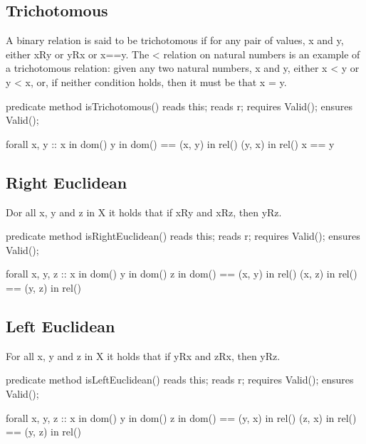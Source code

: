\documentclass[letterpaper,10pt,english]{sphinxmanual}
\begin{document}
\subsection{Trichotomous}
\label{\detokenize{08-relations:trichotomous}}
A binary relation is said to be trichotomous if for any pair of
values, x and y, either xRy or yRx or x==y. The \textless{} relation on natural
numbers is an example of a trichotomous relation: given any two
natural numbers, x and y, either x \textless{} y or y \textless{} x, or, if neither
condition holds, then it must be that x = y.

\begin{sphinxVerbatim}[commandchars=\\\{\}]
predicate method isTrichotomous()
    reads this;
    reads r;
    requires Valid();
    ensures Valid();

\PYGZob{}
    forall x, y :: x in dom() \PYGZam{}\PYGZam{} y in dom() ==\PYGZgt{}
        (x, y) in rel() \textbar{}\textbar{} (y, x) in rel() \textbar{}\textbar{} x == y
\PYGZcb{}
\end{sphinxVerbatim}


\subsection{Right Euclidean}
\label{\detokenize{08-relations:right-euclidean}}
Dor all x, y and z in X it holds that if xRy and xRz, then yRz.

\begin{sphinxVerbatim}[commandchars=\\\{\}]
predicate method isRightEuclidean()
    reads this;
    reads r;
    requires Valid();
    ensures Valid();

\PYGZob{}
    forall x, y, z :: x in dom() \PYGZam{}\PYGZam{} y in dom() \PYGZam{}\PYGZam{} z in dom() ==\PYGZgt{}
        (x, y) in rel() \PYGZam{}\PYGZam{} (x, z) in rel() ==\PYGZgt{} (y, z) in rel()
\PYGZcb{}
\end{sphinxVerbatim}


\subsection{Left Euclidean}
\label{\detokenize{08-relations:left-euclidean}}
For all x, y and z in X it holds that if yRx and zRx, then yRz.

\begin{sphinxVerbatim}[commandchars=\\\{\}]
predicate method isLeftEuclidean()
    reads this;
    reads r;
    requires Valid();
    ensures Valid();

\PYGZob{}
    forall x, y, z :: x in dom() \PYGZam{}\PYGZam{} y in dom() \PYGZam{}\PYGZam{} z in dom() ==\PYGZgt{}
        (y, x) in rel() \PYGZam{}\PYGZam{} (z, x) in rel() ==\PYGZgt{} (y, z) in rel()
\PYGZcb{}
\end{sphinxVerbatim}
\end{document}
